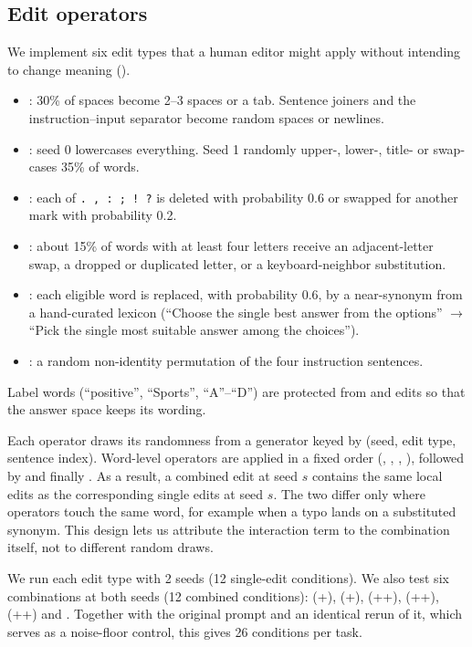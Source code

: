 \subsection{Edit operators}
\label{sec:edits}
We implement six edit types that a human editor might apply without intending to change meaning ().
\begin{itemize}[leftmargin=*,itemsep=0pt,topsep=0pt]
    \item \ws: 30\% of spaces become 2--3 spaces or a tab. Sentence joiners and the instruction--input separator become random spaces or newlines.
    \item \caps: seed 0 lowercases everything. Seed 1 randomly upper-, lower-, title- or swap-cases 35\% of words.
    \item \punct: each of \texttt{. , : ; !\ ?} is deleted with probability 0.6 or swapped for another mark with probability 0.2.
    \item \typo: about 15\% of words with at least four letters receive an adjacent-letter swap, a dropped or duplicated letter, or a keyboard-neighbor substitution.
    \item \syn: each eligible word is replaced, with probability 0.6, by a near-synonym from a hand-curated lexicon (\eg ``Choose the single best answer from the options'' $\to$ ``Pick the single most suitable answer among the choices'').
    \item \reord: a random non-identity permutation of the four instruction sentences.
\end{itemize}
Label words (\eg ``positive'', ``Sports'', ``A''--``D'') are protected from \syn and \typo edits so that the answer space keeps its wording.

Each operator draws its randomness from a generator keyed by (seed, edit type, sentence index). Word-level operators are applied in a fixed order (\syn, \typo, \punct, \caps), followed by \ws and finally \reord. As a result, a combined edit at seed $s$ contains the same local edits as the corresponding single edits at seed $s$. The two differ only where operators touch the same word, for example when a typo lands on a substituted synonym. This design lets us attribute the interaction term to the combination itself, not to different random draws.

We run each edit type with 2 seeds (12 single-edit conditions). We also test six combinations at both seeds (12 combined conditions):  (\ws+\caps),  (\syn+\reord),  (\ws+\caps+\punct),  (\syn+\reord+\typo),  (\caps+\syn+\reord) and . Together with the original prompt and an identical rerun of it, which serves as a noise-floor control, this gives 26 conditions per task.

